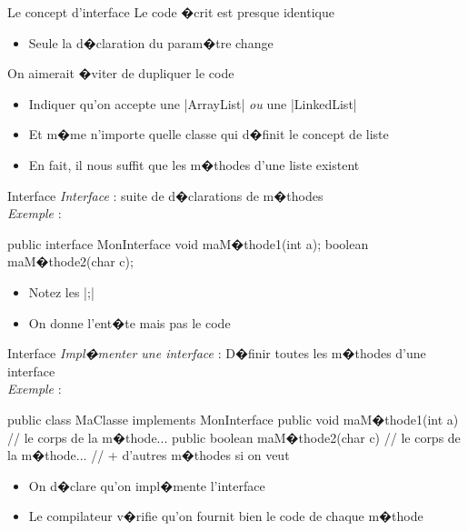 \begin{frame}[fragile]{Le concept d'interface}
Le code �crit est presque identique
  \begin{itemize}
  \item Seule la d�claration du param�tre change
  \end{itemize}
\bigskip
On aimerait �viter de dupliquer le code
  \begin{itemize}
  \item Indiquer qu'on accepte une \java|ArrayList| \emph{ou} une \java|LinkedList|
  \item Et m�me n'importe quelle classe qui d�finit le concept de liste
  \item En fait, il nous suffit que les m�thodes d'une liste existent
  \end{itemize}
\end{frame}

\begin{frame}[fragile]{Interface}
\emph{Interface} : suite de d�clarations de m�thodes
\\\medskip\emph{Exemple} :
\begin{Java}
  public interface MonInterface {
      void maM�thode1(int a);
      boolean maM�thode2(char c);
  } 
\end{Java}
\begin{itemize}
\item Notez les \java|;|
\item On donne l'ent�te mais pas le code
\end{itemize}
\end{frame}

\begin{frame}[fragile]{Interface}
\emph{Impl�menter une interface} : D�finir toutes les m�thodes d'une interface
\\\medskip\emph{Exemple} :
\begin{Java}
  public class MaClasse implements MonInterface {
      public void maM�thode1(int a) {// le corps de la m�thode...}
      public boolean maM�thode2(char c) {// le corps de la m�thode...}
      // + d'autres m�thodes si on veut
  } 
\end{Java}
\begin{itemize}
\item On d�clare qu'on impl�mente l'interface
\item Le compilateur v�rifie qu'on fournit bien le code de chaque m�thode
\end{itemize}
\end{frame}

